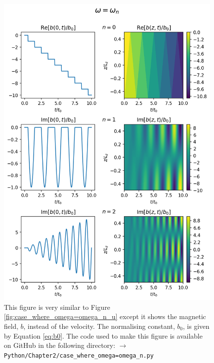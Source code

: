 \begin{figure}
    \centering
    \vspace{-20pt}
    \includegraphics[width=\textwidth,height=0.9\textheight,keepaspectratio]{figures/chapter02/case_where_omega=omega_n_b.png}
    \vspace{-10pt}
    \caption{This figure is very similar to Figure \ref{fig:case_where_omega=omega_n_u} except it shows the magnetic field, $b$, instead of the velocity. The normalising constant, $b_0$, is given by Equation \eqref{eq:b0}. The code used to make this figure is available on GitHub in the following directory:\newline
    \texttt{$\rightarrow$ Python/Chapter2/case\_where\_omega=omega\_n.py}}
    \vspace{-30pt}
    \label{fig:case_where_omega=omega_n_b}
\end{figure}

